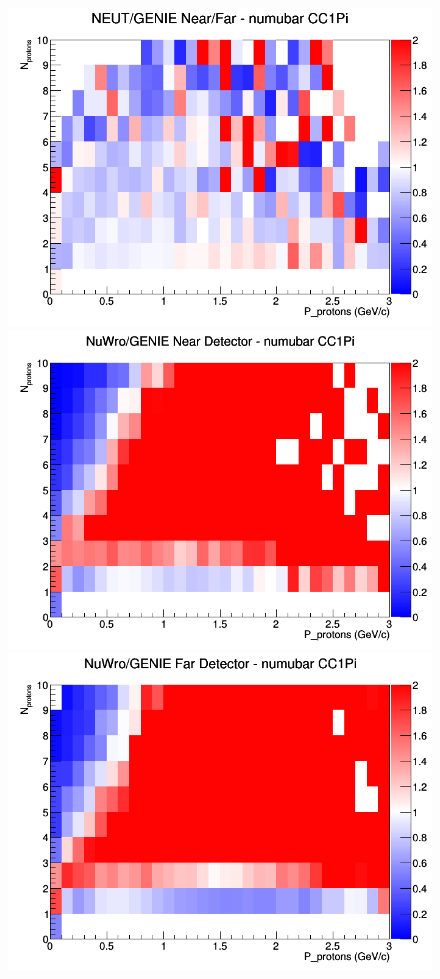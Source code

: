 \begin{figure}[h]
\endminipage
{}
\includegraphics[width=\linewidth]{N_P/nominal/protons/ratios/CC1Pi_NEUT_GENIE_numubar_NF_N_P.png}
\endminipage
\newline
{}
\includegraphics[width=\linewidth]{N_P/nominal/protons/ratios/CC1Pi_NuWro_GENIE_numubar_near_N_P.png}
\endminipage
{}
\includegraphics[width=\linewidth]{N_P/nominal/protons/ratios/CC1Pi_NuWro_GENIE_numubar_far_N_P.png}

\end{figure}
